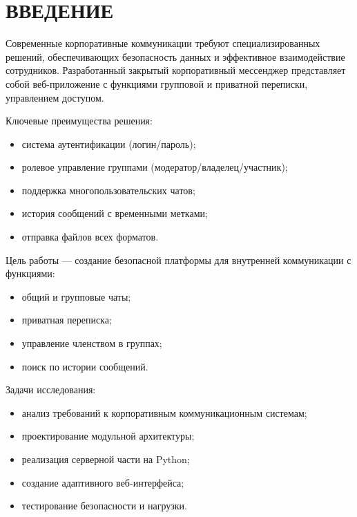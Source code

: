 \section*{ВВЕДЕНИЕ}

Современные корпоративные коммуникации требуют специализированных решений, обеспечивающих безопасность данных и эффективное взаимодействие сотрудников. Разработанный закрытый корпоративный мессенджер представляет собой веб-приложение с функциями групповой и приватной переписки, управлением доступом.

Ключевые преимущества решения:
\begin{itemize}
	\item система аутентификации (логин/пароль);
	\item ролевое управление группами (модератор/владелец/участник);
	\item поддержка многопользовательских чатов;
	\item история сообщений с временными метками;
	\item отправка файлов всех форматов.
\end{itemize}

Цель работы — создание безопасной платформы для внутренней коммуникации с функциями:
\begin{itemize}
	\item общий и групповые чаты;
	\item приватная переписка;
	\item управление членством в группах;
	\item поиск по истории сообщений.
\end{itemize}

Задачи исследования:
\begin{itemize}
	\item анализ требований к корпоративным коммуникационным системам;
	\item проектирование модульной архитектуры;
	\item реализация серверной части на Python;
	\item создание адаптивного веб-интерфейса;
	\item тестирование безопасности и нагрузки.
\end{itemize}